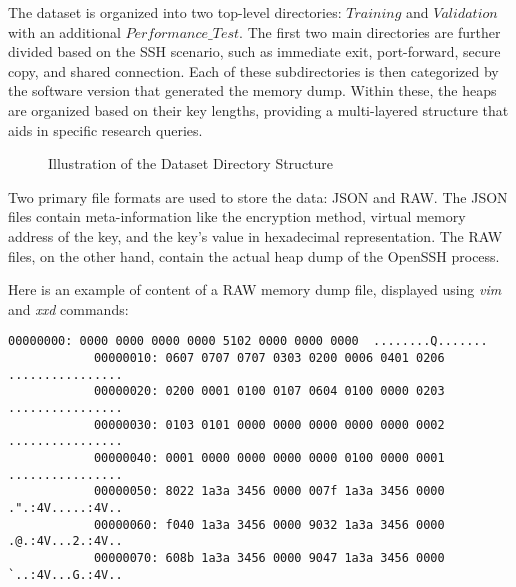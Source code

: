     \begin{minipage}{\dimexpr\linewidth-20pt}
        The dataset is organized into two top-level directories: $Training$ and $Validation$ with an additional $Performance\_Test$. The first two main directories are further divided based on the SSH scenario, such as immediate exit, port-forward, secure copy, and shared connection. Each of these subdirectories is then categorized by the software version that generated the memory dump. Within these, the heaps are organized based on their key lengths, providing a multi-layered structure that aids in specific research queries.

        \begin{figure}[H]
            \centering
            \caption{Illustration of the Dataset Directory Structure}
            \label{fig:dataset_structure}
            \begin{minipage}{0.6\textwidth}
        \end{minipage}
        \end{figure}
    \end{minipage}

    Two primary file formats are used to store the data: JSON and RAW. The JSON files contain meta-information like the encryption method, virtual memory address of the key, and the key's value in hexadecimal representation. The RAW files, on the other hand, contain the actual heap dump of the OpenSSH process.

    \begin{minipage}{\dimexpr\linewidth-20pt}
        Here is an example of content of a RAW memory dump file, displayed using \textit{vim} and \textit{xxd} commands:

        \begin{lstlisting}[style=hexdump, caption={16 bytes per line visualization of a Hex Dump from \textit{Training/basic/V\_7\_8\_P1/16/5070-1643978841-heap.raw}}]
            00000000: 0000 0000 0000 0000 5102 0000 0000 0000  ........Q.......
            00000010: 0607 0707 0707 0303 0200 0006 0401 0206  ................
            00000020: 0200 0001 0100 0107 0604 0100 0000 0203  ................
            00000030: 0103 0101 0000 0000 0000 0000 0000 0002  ................
            00000040: 0001 0000 0000 0000 0000 0100 0000 0001  ................
            00000050: 8022 1a3a 3456 0000 007f 1a3a 3456 0000  .".:4V.....:4V..
            00000060: f040 1a3a 3456 0000 9032 1a3a 3456 0000  .@.:4V...2.:4V..
            00000070: 608b 1a3a 3456 0000 9047 1a3a 3456 0000  `..:4V...G.:4V..
        \end{lstlisting}
    \end{minipage}

